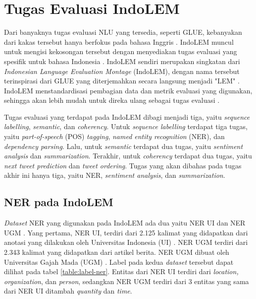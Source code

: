 \section{Tugas Evaluasi IndoLEM}

Dari banyaknya tugas evaluasi NLU yang tersedia, seperti GLUE, kebanyakan dari kakas tersebut hanya berfokus pada bahasa Inggris \parencite{indolem}. IndoLEM muncul untuk mengisi kekosongan tersebut dengan menyediakan tugas evaluasi yang spesifik untuk bahasa Indonesia \parencite{indolem}. IndoLEM sendiri merupakan singkatan dari \textit{Indonesian Language Evaluation Montage} (IndoLEM), dengan nama tersebut terinspirasi dari GLUE yang diterjemahkan secara langsung menjadi "LEM" \parencite{indolem}. IndoLEM menstandardisasi pembagian data dan metrik evaluasi yang digunakan, sehingga akan lebih mudah untuk direka ulang sebagai tugas evaluasi \parencite{indolem}.

Tugas evaluasi yang terdapat pada IndoLEM dibagi menjadi tiga, yaitu \textit{sequence labelling}, \textit{semantic}, dan \textit{coherency}. Untuk \textit{sequence labelling} terdapat tiga tugas, yaitu \textit{part-of-speech} (POS) \textit{tagging}, \textit{named entity recognition} (NER), dan \textit{dependency parsing}. Lalu, untuk \textit{semantic} terdapat dua tugas, yaitu \textit{sentiment analysis} dan \textit{summarization}. Terakhir, untuk \textit{coherency} terdapat dua tugas, yaitu \textit{next tweet prediction} dan \textit{tweet ordering}. Tugas yang akan dibahas pada tugas akhir ini hanya tiga, yaitu NER, \textit{sentiment analysis}, dan \textit{summarization}.

\subsection{NER pada IndoLEM}

\textit{Dataset} NER yang digunakan pada IndoLEM ada dua yaitu NER UI dan NER UGM \parencite{indolem}. Yang pertama, NER UI, terdiri dari 2.125 kalimat yang didapatkan dari anotasi yang dilakukan oleh Universitas Indonesia (UI) \parencite{indolem}. NER UGM terdiri dari 2.343 kalimat yang didapatkan dari artikel berita. NER UGM dibuat oleh Universitas Gajah Mada (UGM) \parencite{indolem}. Label pada kedua \textit{dataset} tersebut dapat dilihat pada tabel \ref{table:label-ner}. Entitas dari NER UI terdiri dari \textit{location, organization}, dan \textit{person}, sedangkan NER UGM terdiri dari 3 entitas yang sama dari NER UI ditambah \textit{quantity} dan \textit{time}.

